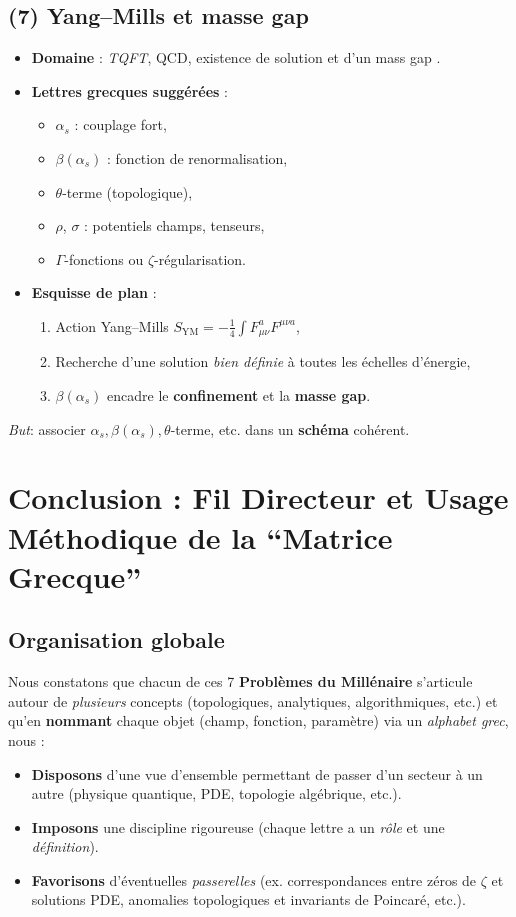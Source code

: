 \documentclass[12pt]{article}
\begin{document}
\subsection{(7) Yang--Mills et masse gap}
\begin{itemize}
    \item \textbf{Domaine} : \emph{TQFT}, QCD, existence de solution et d’un \og mass gap \fg.
    \item \textbf{Lettres grecques suggérées} :
    \begin{itemize}
        \item \(\alpha_s\) : couplage fort,
        \item \(\beta(\alpha_s)\) : fonction de renormalisation,
        \item \(\theta\)-terme (topologique),
        \item \(\rho\), \(\sigma\) : potentiels champs, tenseurs, 
        \item \(\Gamma\)-fonctions ou \(\zeta\)-régularisation.
    \end{itemize}
    \item \textbf{Esquisse de plan} :
    \begin{enumerate}
        \item Action Yang--Mills $S_{\mathrm{YM}} = -\tfrac14\int F_{\mu\nu}^a F^{\mu\nu a}$,
        \item Recherche d’une solution \emph{bien définie} à toutes les échelles d’énergie,
        \item \(\beta(\alpha_s)\) encadre le \textbf{confinement} et la \textbf{masse gap}.
    \end{enumerate}
\end{itemize}
\emph{But}: associer \(\alpha_s, \beta(\alpha_s), \theta\)-terme, etc. dans un \textbf{schéma} cohérent.

\section{Conclusion : Fil Directeur et Usage Méthodique de la “Matrice Grecque”}

\subsection{Organisation globale}
Nous constatons que chacun de ces 7 \textbf{Problèmes du Millénaire} 
s’articule autour de \emph{plusieurs} concepts (topologiques, analytiques, algorithmiques, etc.) 
et qu’en \textbf{nommant} chaque objet (champ, fonction, paramètre) 
via un \emph{alphabet grec}, nous :
\begin{itemize}
    \item \textbf{Disposons} d’une vue d’ensemble permettant de passer 
          d’un secteur à un autre (physique quantique, PDE, topologie algébrique, etc.).
    \item \textbf{Imposons} une discipline rigoureuse (chaque lettre 
          a un \emph{rôle} et une \emph{définition}).
    \item \textbf{Favorisons} d’éventuelles \emph{passerelles} 
          (ex. correspondances entre zéros de \(\zeta\) et solutions PDE, 
           anomalies topologiques et invariants de Poincaré, etc.).
\end{itemize}
\end{document}
